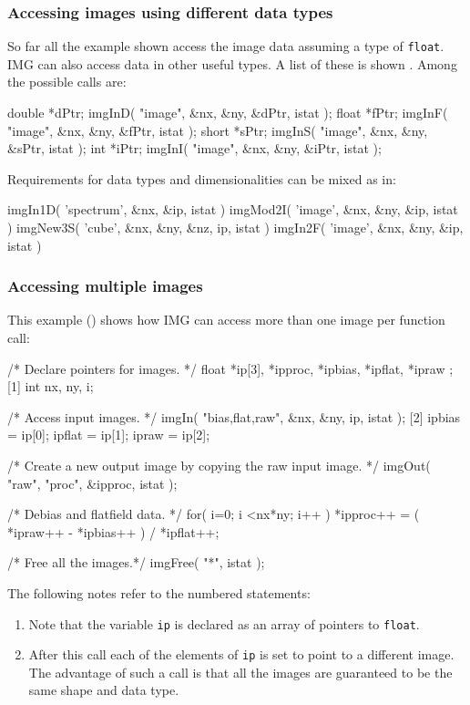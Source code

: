 \documentclass[twoside,11pt,nolof]{starlink}
\providecommand{\myverb}[1]{{\texttt{#1}}}
\providecommand{\mynote}{The following notes refer to the numbered statements:}
\newenvironment{code}{\begin{small}}
                     {\end{small}}
\newenvironment{enumnotes}
{
   \renewcommand{\labelenumi}{\myverb{[\theenumi]}}
   \begin{enumerate}
}{
   \end{enumerate}
   \renewcommand{\labelenumi}{\theenumi}
}
\begin{document}
\subsubsection{Accessing images using different data types}
So far all the example shown access the image data assuming a type of
\myverb{float}. IMG can also access data in other useful types. A list
of these is shown . Among
the possible calls are:
\begin{code}
\begin{terminalv}
   double *dPtr;
   imgInD( "image", &nx, &ny, &dPtr, istat );
   float *fPtr;
   imgInF( "image", &nx, &ny, &fPtr, istat );
   short *sPtr;
   imgInS( "image", &nx, &ny, &sPtr, istat );
   int *iPtr;
   imgInI( "image", &nx, &ny, &iPtr, istat );
\end{terminalv}
\end{code}

Requirements for data types and dimensionalities can be mixed as in:
\begin{code}
\begin{terminalv}
   imgIn1D( 'spectrum', &nx, &ip, istat )
   imgMod2I( 'image', &nx, &ny, &ip, istat )
   imgNew3S( 'cube', &nx, &ny, &nz, ip, istat )
   imgIn2F( 'image', &nx, &ny, &ip, istat )
\end{terminalv}
\end{code}

\subsubsection{Accessing multiple images}
This example
(\htmladdnormallink{\myverb{proc.c}}{../../bin/examples/img/proc.c})
shows how IMG can access more than one image per function call:
\begin{code}
\begin{terminalv}
   /*  Declare pointers for images. */
   float *ip[3], *ipproc, *ipbias, *ipflat, *ipraw ;              [1]
   int nx, ny, i;

   /*  Access input images. */
   imgIn( "bias,flat,raw", &nx, &ny, ip, istat );                 [2]
   ipbias = ip[0];
   ipflat = ip[1];
   ipraw = ip[2];

   /*  Create a new output image by copying the raw input image. */
   imgOut( "raw", "proc", &ipproc, istat );

   /*  Debias and flatfield data. */
   for( i=0; i <nx*ny; i++ ) {
      *ipproc++ = ( *ipraw++ - *ipbias++ ) / *ipflat++;
   }

   /*  Free all the images.*/
   imgFree( "*", istat );
\end{terminalv}
\end{code}
\mynote
\begin{enumnotes}
\item Note that the variable \myverb{ip} is declared as an array of
pointers to \myverb{float}.
\item After this call each of the elements of \myverb{ip} is set to
point to a different image. The advantage of such a call is that all
the images are guaranteed to be the same shape and data type.
\end{enumnotes}
\end{document}

